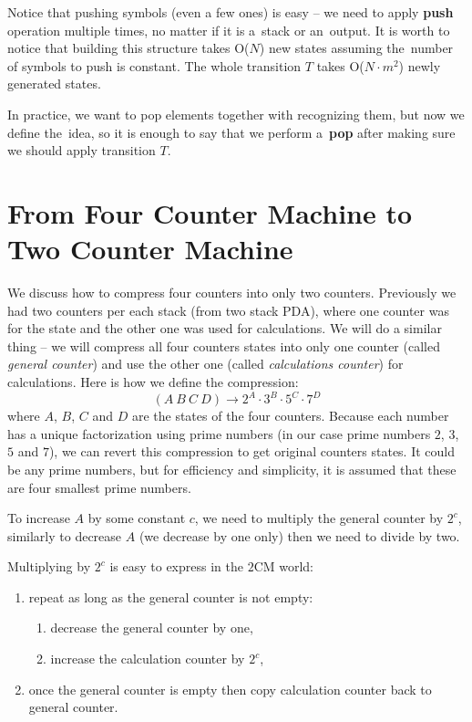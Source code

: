 \documentclass[english,shortabstract,mgr]{iithesis}
\begin{document}
Notice that pushing symbols (even a few ones) is easy -- we need to apply \textbf{push} operation
multiple times, no matter if it is a~stack or an~output. It is worth to notice
that building this structure takes O($N$) new states assuming the~number of symbols
to push is constant. The whole transition $T$ takes O($N \cdot m^2$) newly
generated states.

In practice, we want to pop elements together with recognizing them, but now we define the~idea, so
it is enough to say that we perform a~\textbf{pop} after making sure we should apply transition $T$.

\section {From Four Counter Machine to Two Counter Machine}

We discuss how to compress four counters into only two counters. Previously we had
two counters per each stack (from two stack PDA), where one counter was
for the state and the other one was used for calculations. We will do a similar
thing -- we will compress all four counters states into only one counter
(called \textit{general counter}) and use the other one
(called \textit{calculations counter}) for calculations. Here is how we define
the compression:
$$ (A\ B\ C\ D) \rightarrow 2^A \cdot 3^B \cdot 5^C \cdot 7^D$$
where $A$, $B$, $C$ and $D$ are the states of the four counters. Because each
number has a unique factorization using prime numbers (in our case
prime numbers $2$, $3$, $5$ and $7$), we can revert this compression
to get original counters states. It could be any prime numbers,
but for efficiency and simplicity, it is assumed that these are four smallest
prime numbers.

To increase $A$ by some constant $c$, we need
to multiply the general counter by $2^c$, similarly to decrease $A$
(we decrease by one only) then we need to divide by two.

Multiplying by $2^c$ is easy to express in the $2$CM world:
\begin{enumerate}
  \item repeat as long as the general counter is not empty:
  \begin{enumerate}
    \item decrease the general counter by one,
    \item increase the calculation counter by $2^c$,
  \end{enumerate}
  \item once the general counter is empty then copy calculation counter back to general counter.
\end{enumerate}
\end{document}
